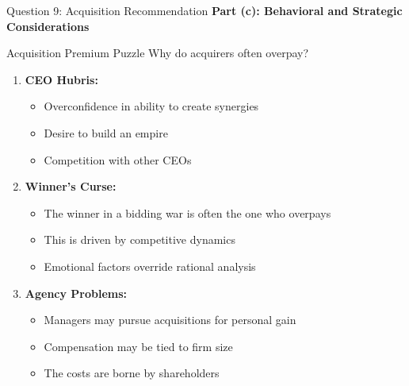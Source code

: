 \documentclass[aspectratio=169]{beamer}
\newcommand{\question}[1]{{\large\bfseries\color{crimson}#1}}
\begin{document}
	\begin{frame}{Question 9: Acquisition Recommendation}
		\question{Part (c): Behavioral and Strategic Considerations}
		
		\begin{block}{Acquisition Premium Puzzle}
			Why do acquirers often overpay?
			\begin{enumerate}
				\item \textbf{CEO Hubris:}
				\begin{itemize}
					\item Overconfidence in ability to create synergies
					\item Desire to build an empire
					\item Competition with other CEOs
				\end{itemize}
				
				\item \textbf{Winner's Curse:}
				\begin{itemize}
					\item The winner in a bidding war is often the one who overpays
					\item This is driven by competitive dynamics
					\item Emotional factors override rational analysis
				\end{itemize}
				
				\item \textbf{Agency Problems:}
				\begin{itemize}
					\item Managers may pursue acquisitions for personal gain
					\item Compensation may be tied to firm size
					\item The costs are borne by shareholders
				\end{itemize}
			\end{enumerate}
		\end{block}
	\end{frame}
	
\end{document}
